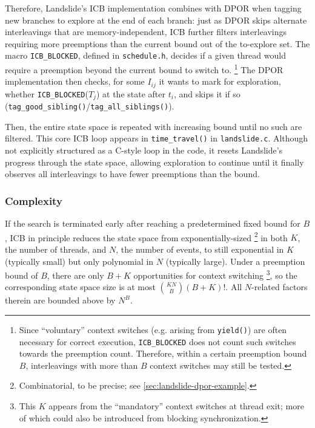Therefore, Landslide's ICB implementation combines with DPOR
when tagging new branches to explore at the end of each branch:
just as DPOR skips alternate interleavings that are memory-independent,
ICB further filters interleavings requiring more preemptions than the current bound
out of the to-explore set.
The macro {\tt ICB\_BLOCKED},
defined in {\tt schedule.h},
decides if a given thread would require a preemption beyond the current bound to switch to.%
\footnote{Since ``voluntary'' context switches (e.g. arising from {\tt yield()})
are often necessary for correct execution,
{\tt ICB\_BLOCKED} does not count such switches towards the preemption count.
Therefore, within a certain preemption bound $B$,
interleavings with more than $B$ context switches may still be tested.
}
The DPOR implementation then checks, for some $I_{ij}$ it wants to mark for exploration,
whether {\tt ICB\_BLOCKED}($T_j$) at the state after $t_i$,
and skips it if so ({\tt tag\_good\_sibling()}/{\tt tag\_all\_siblings()}).

Then, the entire state space is repeated with increasing bound until no such are filtered.
This core ICB loop appears in {\tt time\_travel()} in {\tt landslide.c}.
Although not explicitly structured as a C-style loop in the code,
it resets Landslide's progress through the state space,
allowing exploration to continue until it finally observes all interleavings to have fewer preemptions than the bound.

\subsubsection{Complexity}

If the search is terminated early after reaching a predetermined fixed bound for $B$,
ICB in principle reduces the state space from exponentially-sized%
\footnote{Combinatorial, to be precise; see \cref{sec:landslide-dpor-example}.}
in both $K$, the number of threads,
and $N$, the number of events,
to still exponential in $K$ (typically small) but only polynomial in $N$ (typically large).
Under a preemption bound of $B$, there are only $B+K$ opportunities for context switching%
\footnote{This $K$ appears from the ``mandatory'' context switches at thread exit;
more of which could also be introduced from blocking synchronization.},
so the corresponding state space size is at most ${KN \choose B}(B+K)!$.
All $N$-related factors therein are bounded above by $N^B$.

